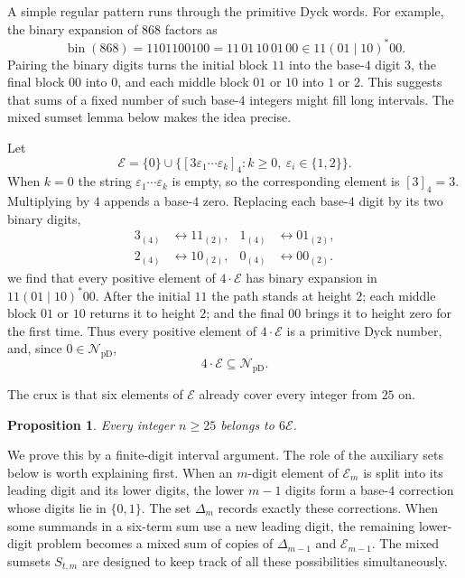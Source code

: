 \documentclass[12pt]{article}
\theoremstyle{plain}
\newtheorem{proposition}[theorem]{Proposition}
\newcommand{\val}[2]{[#1]_{#2}}
\newcommand{\NpD}{\mathcal{N}_{\mathrm{pD}}}
\begin{document}
A simple regular pattern runs through the primitive Dyck words.  For
example, the binary expansion of $868$ factors as
\[
 \operatorname{bin}(868)=1101100100=11\,01\,10\,01\,00
 \in 11(01\mid10)^*00 .
\]
Pairing the binary digits turns the initial block $11$ into the base-$4$
digit $3$, the final block $00$ into $0$, and each middle block $01$ or
$10$ into $1$ or $2$.  This suggests that sums of a fixed number of such
base-$4$ integers might fill long intervals.  The mixed sumset lemma
below makes the idea precise.

Let
\[
 \mathcal E=\{0\}\cup
 \bigl\{\val{3\varepsilon_1\cdots\varepsilon_k}{4}:
        k\geq0,\ \varepsilon_i\in\{1,2\}\bigr\}.
\]
When $k=0$ the string $\varepsilon_1\cdots\varepsilon_k$ is empty, so
the corresponding element is $\val{3}{4}=3$.  Multiplying by $4$ appends
a base-$4$ zero.  Replacing each base-$4$ digit by its two binary digits,
\[
\begin{aligned}
 3_{(4)}&\longleftrightarrow11_{(2)},&
 1_{(4)}&\longleftrightarrow01_{(2)},\\
 2_{(4)}&\longleftrightarrow10_{(2)},&
 0_{(4)}&\longleftrightarrow00_{(2)}.
\end{aligned}
\]
we find that every positive element of $4\cdot\mathcal E$ has binary
expansion in $11(01\mid10)^*00$.  After the initial $11$ the path stands
at height $2$; each middle block $01$ or $10$ returns it to height $2$;
and the final $00$ brings it to height zero for the first time.  Thus
every positive element of $4\cdot\mathcal E$ is a primitive Dyck number,
and, since $0\in\NpD$,
\begin{equation}\label{eq:4E}
        4\cdot\mathcal E\subseteq\NpD.
\end{equation}

The crux is that six elements of $\mathcal E$ already cover every integer
from $25$ on.

\begin{proposition}\label{prop:E}
Every integer $n\geq25$ belongs to $6\mathcal E$.
\end{proposition}

We prove this by a finite-digit interval argument.  The role of the
auxiliary sets below is worth explaining first.  When an $m$-digit element
of $\mathcal E_m$ is split into its leading digit and its lower digits, the
lower $m-1$ digits form a base-$4$ correction whose digits lie in
$\{0,1\}$.  The set $\Delta_m$ records exactly these corrections.  When
some summands in a six-term sum use a new leading digit, the remaining
lower-digit problem becomes a mixed sum of copies of $\Delta_{m-1}$ and
$\mathcal E_{m-1}$.  The mixed sumsets $S_{t,m}$ are designed to keep
track of all these possibilities simultaneously.
\end{document}
